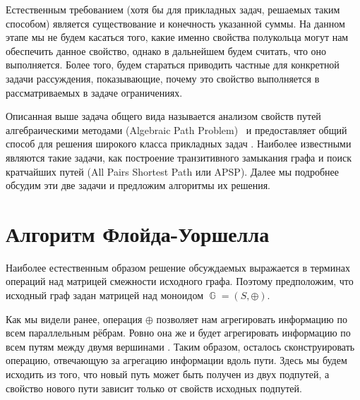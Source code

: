 Естественным требованием (хотя бы для прикладных задач, решаемых таким способом) является существование и конечность указанной суммы.
На данном этапе мы не будем касаться того, какие именно свойства полукольца могут нам обеспечить данное свойство, однако в дальнейшем будем считать, что оно выполняется.
Более того, будем стараться приводить частные для конкретной задачи рассуждения, показывающие, почему это свойство выполняется в рассматриваемых в задаче ограничениях.

Описанная выше задача общего вида называется анализом свойств путей алгебраическими методами (Algebraic Path Problem)~ и предоставляет общий способ для решения широкого класса прикладных задач%
.
Наиболее известными являются такие задачи, как построение транзитивного замыкания графа и поиск кратчайших путей (All Pairs Shortest Path или APSP).
Далее мы подробнее обсудим эти две задачи и предложим алгоритмы их решения.

\section{Алгоритм Флойда-Уоршелла}

Наиболее естественным образом решение обсуждаемых выражается в терминах операций над матрицей смежности исходного графа.
Поэтому предположим, что исходный граф задан матрицей над моноидом $\BbbG = (S,\oplus)$.

Как мы видели ранее, операция $\oplus$ позволяет нам агрегировать информацию по всем параллельным рёбрам.
Ровно она же и будет агрегировать информацию по всем путям между двумя вершинами%
.
Таким образом, осталось сконструировать операцию, отвечающую за агрегацию информации вдоль пути.
Здесь мы будем исходить из того, что новый путь может быть получен из двух подпутей, а свойство нового пути зависит только от свойств исходных подпутей.


